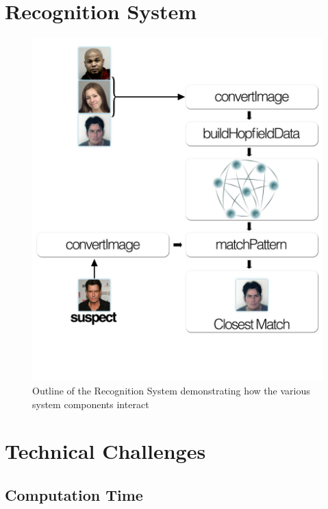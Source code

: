 \section{Recognition System}

\begin{figure}[h]
  \centering
\includegraphics[scale=0.3]{recognition.jpg}
\caption{Outline of the Recognition System demonstrating how the various system components interact}
\label{fig:recognition-system}
\end{figure}




\section{Technical Challenges}

\subsection{Computation Time}


